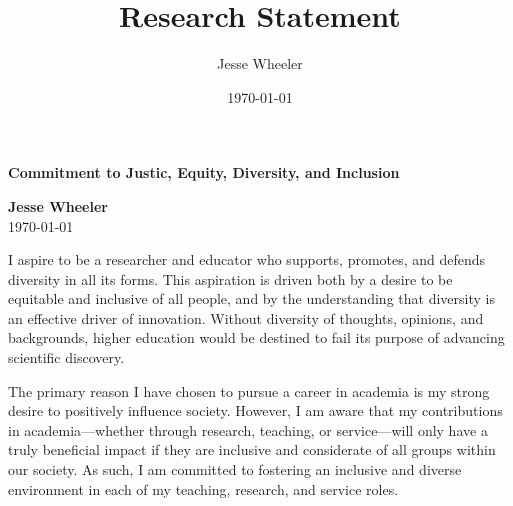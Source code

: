\documentclass[11pt]{article}
\title{Research Statement}
\author{Jesse Wheeler}
\date{\today}
\begin{document}
\rule{0mm}{1mm}
\vspace{-20mm}


\vspace{1mm}

\begin{center}
{\Large {\bf Commitment to Justic, Equity, Diversity, and Inclusion}}

\vspace{2mm}

{\bf Jesse Wheeler} \\
\today
\end{center}


\vspace{4mm}


I aspire to be a researcher and educator who supports, promotes, and defends diversity in all its forms.
This aspiration is driven both by a desire to be equitable and inclusive of all people, and by the understanding that diversity is an effective driver of innovation.
Without diversity of thoughts, opinions, and backgrounds, higher education would be destined to fail its purpose of advancing scientific discovery.

The primary reason I have chosen to pursue a career in academia is my strong desire to positively influence society.
However, I am aware that my contributions in academia---whether through research, teaching, or service---will only have a truly beneficial impact if they are inclusive and considerate of all groups within our society.
As such, I am committed to fostering an inclusive and diverse environment in each of my teaching, research, and service roles.

\end{document}

